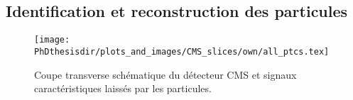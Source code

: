 \subsection{Identification et reconstruction des particules}\label{chapter-LHC-section-evt_reco-subsec-ptc_ID}
\begin{figure}
\texttt{[image: \\PhDthesisdir/plots\_and\_images/CMS\_slices/own/all\_ptcs.tex]}
\caption[Coupe transverse schématique du détecteur CMS.]{Coupe transverse schématique du détecteur CMS et signaux caractéristiques laissés par les particules.}
\label{fig-chapter-LHC-section-evt_reco-subsec-ptc_ID-cms_slice}
\end{figure}